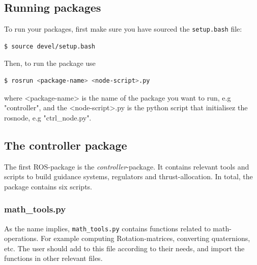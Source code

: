 \subsection{Running packages}

To run your packages, first make sure you have sourced the \lstinline{setup.bash} file:

\begin{lstlisting}[language=bash,basicstyle=\mlttfamily, breaklines=true]
  $ source devel/setup.bash
\end{lstlisting}

Then, to run the package use

\begin{lstlisting}[language=bash,basicstyle=\mlttfamily, breaklines=true]
  $ rosrun <package-name> <node-script>.py
\end{lstlisting}

where <package-name> is the name of the package you want to run, e.g "controller", and the <node-script>.py is the python script that initialisez the rosnode, e.g "ctrl\_node.py". 


\subsection{The controller package}
The first ROS-package is the \textit{controller}-package. It contains relevant tools and scripts to build guidance systems, regulators and thrust-allocation. In total, the package contains six scripts.

\subsubsection{math\_tools.py}
As the name implies, \lstinline{math_tools.py} contains functions related to math-operations. For example computing Rotation-matrices, converting quaternions, etc. The user should add to this file according to their needs, and import the functions in other relevant files. 

